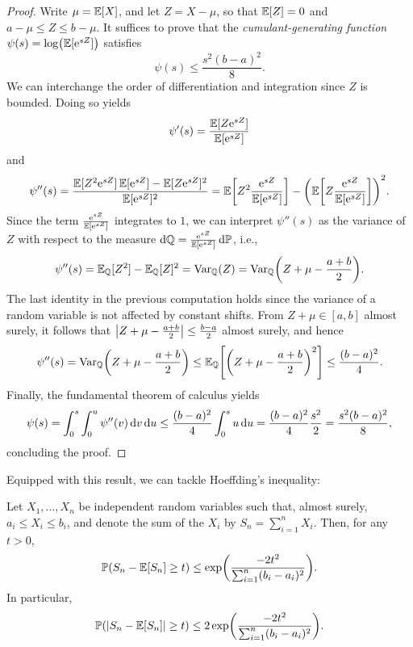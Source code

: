 \begin{proof}
Write $\mu = \operatorname{\mathbb{E}}[X]$, and let $Z = X - \mu$, so that $\operatorname{\mathbb{E}}[Z] = 0$ and $a - \mu \leq Z \leq b - \mu$. It suffices to prove that the \emph{cumulant-generating function} $\psi(s) = \log(\operatorname{\mathbb{E}}[\mathrm{e}^{sZ}])$ satisfies
\[
    \psi(s) \leq \frac{s^2(b - a)^2}{8}.
\]
We can interchange the order of differentiation and integration since $Z$ is bounded. Doing so yields
\[
    \psi'(s) = \frac{\operatorname{\mathbb{E}}[Z \mathrm{e}^{sZ}]}{\operatorname{\mathbb{E}}[\mathrm{e}^{sZ}]}
\]
and
\[
    \psi''(s) = \frac{\Exp[Z^2 \e^{sZ}] \Exp[\e^{sZ}] - \Exp[Z \e^{sZ}]^2}{\Exp[\e^{sZ}]^2} = \Exp\left[ Z^2 \frac{\e^{sZ}}{\Exp[\e^{sZ}]} \right] - \left(\Exp\left[ Z \frac{\e^{sZ}}{\Exp[\e^{sZ}]} \right]\right)^2.
\]
Since the term $\frac{\mathrm{e}^{sZ}}{\operatorname{\mathbb{E}}[\mathrm{e}^{sZ}]}$ integrates to $1$, we can interpret $\psi''(s)$ as the variance of $Z$ with respect to the measure $\mathrm{d}\mathbb{Q} = \frac{\mathrm{e}^{sZ}}{\operatorname{\mathbb{E}}[\mathrm{e}^{sZ}]} \, \mathrm{d}\mathbb{P}$, i.e.,
\[
    \psi''(s) = \Exp_{\mathbb{Q}}[Z^2] - \Exp_{\mathbb{Q}}[Z]^2 = \Var_{\mathbb{Q}}(Z) = \Var_{\mathbb{Q}}\left( Z + \mu - \frac{a + b}{2} \right).
\]
The last identity in the previous computation holds since the variance of a random variable is not affected by constant shifts. From $Z + \mu \in [a,b]$ almost surely, it follows that $\abs{Z + \mu - \frac{a+b}{2}} \leq \frac{b-a}{2}$ almost surely, and hence
\[
    \psi''(s) = \Var_{\mathbb{Q}}\left( Z + \mu - \frac{a + b}{2} \right) \leq \Exp_{\mathbb{Q}}\left[\left( Z + \mu - \frac{a + b}{2} \right)^2\right] \leq \frac{(b - a)^2}{4}.
\]
Finally, the fundamental theorem of calculus yields
\[
    \psi(s) = \int_0^s \int_0^u \psi''(v) \, \mathrm{d}v \, \mathrm{d}u \leq \frac{(b - a)^2}{4} \int_0^s u \, \mathrm{d}u = \frac{(b - a)^2}{4} \frac{s^2}{2} = \frac{s^2 (b - a)^2}{8},
\]
concluding the proof.
\end{proof}

Equipped with this result, we can tackle Hoeffding's inequality:

\begin{theorem}[Hoeffding, 1963]
\label{thm: hoeffding}
Let $X_1, \dots, X_n$ be independent random variables such that, almost surely, $a_i \leq X_i \leq b_i$, and denote the sum of the $X_i$ by $S_n = \sum_{i=1}^n X_i$. Then, for any $t>0$,
\[
    \mathbb{P}(S_n - \operatorname{\mathbb{E}}[S_n] \geq t) \leq \exp(\frac{-2t^2}{\sum_{i=1}^n (b_i - a_i)^2}).
\]
In particular,
\[
    \mathbb{P}(\abs{S_n - \operatorname{\mathbb{E}}[S_n]} \geq t) \leq 2 \exp(\frac{-2t^2}{\sum_{i=1}^n (b_i - a_i)^2}).
\]
\end{theorem}

